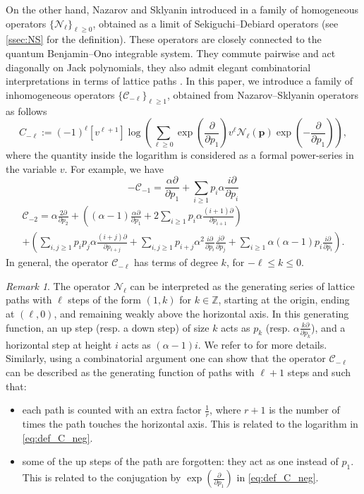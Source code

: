 \documentclass[12pt]{amsart}
\theoremstyle{remark}
\newtheorem{remark}{Remark}
\newcommand{\bfp}{\boldsymbol{p}}
\newcommand{\C}{\mathcal C}
\newcommand{\ZZ}{\mathbb Z}
\newcommand{\N}{\mathcal{N}}
\begin{document}
On the other hand, Nazarov and Sklyanin introduced in \cite{NazarovSklyanin2013b,NazarovSklyanin2013} a family of homogeneous operators $\{\N_\ell\}_{\ell\geq 0}$, obtained as a limit of Sekiguchi–Debiard operators (see \cref{ssec:NS} for the definition). These operators are closely connected to the quantum Benjamin--Ono integrable system. They commute pairwise and act diagonally on Jack polynomials, they also admit elegant combinatorial interpretations in terms of lattice paths \cite{Moll2015,CuencaDolegaMoll2023}.  In this paper, we introduce a family of inhomogeneous operators $\{\C_{-\ell}\}_{\ell\geq 1}$, obtained from Nazarov--Sklyanin operators as follows
\begin{equation}\label{eq:def_C_neg}
   C_{-\ell}:=(-1)^\ell[v^{\ell+1}]\log\left(\sum_{\ell\geq 0}\exp\left(\frac{\partial}{\partial p_1}\right) v^\ell\N_\ell (\bfp) \exp\left(-\frac{\partial}{\partial p_1}\right)\right),  
\end{equation}
where the quantity inside the logarithm is considered as a formal power-series in the variable $v$.
For example, we have
$$-\C_{-1}=\frac{\alpha \partial}{\partial p_1}+\sum_{i\geq 1}p_i\alpha\frac{i\partial}{\partial p_i}$$
\begin{multline*}
  \C_{-2}=\alpha\frac{2\partial}{\partial p_2}+\left((\alpha-1)\frac{\alpha\partial}{\partial p_1}+2\sum_{i\geq 1}p_i\alpha\frac{(i+1)\partial}{\partial p_{i+1}}\right)\\
  +\left(\sum_{i,j\geq 1}p_ip_j\alpha\frac{(i+j)\partial}{\partial p_{i+j}}+\sum_{i,j\geq 1}p_{i+j}\alpha^2\frac{i\partial}{\partial p_i}\frac{j\partial}{\partial p_j}+\sum_{i\geq 1}\alpha(\alpha-1)p_i\frac{i\partial}{\partial p_i}\right).  
\end{multline*}
In general, the operator $\C_{-\ell}$ has terms of degree $k$, for $-\ell\leq k\leq 0.$

\begin{remark}
    The operator $\N_\ell$ can be interpreted as the generating series of lattice paths with $\ell$ steps of the form $(1,k)$ for $k\in \ZZ$, starting at the origin, ending at $(\ell,0)$, and remaining weakly above the horizontal axis. In this generating function, an up step (resp. a down step) of size $k$ acts as $p_k$ (resp. $\alpha\frac{ k \partial}{\partial p_k}$), and a horizontal step at height $i$ acts as $(\alpha-1)i$. We refer to \cite[Section 3]{CuencaDolegaMoll2023} for more details. Similarly, using a combinatorial argument one can show that the operator $\C_{-\ell}$ can be described as the generating function of paths with $\ell+1$ steps and such that:
    \begin{itemize}
        \item each path is counted with an extra factor $\frac{1}{r}$, where $r+1$ is the number of times the path touches the horizontal axis. This is related to the logarithm in \cref{eq:def_C_neg}.
        \item some of the up steps of the path are forgotten: they act as one instead of $p_1$. This is related to the conjugation by $\exp(\frac{\partial}{\partial p_1})$ in \cref{eq:def_C_neg}.
    \end{itemize}
\end{remark}
\end{document}
